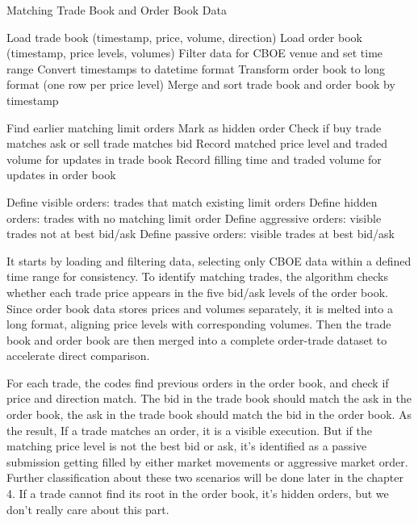 \begin{algorithm}
    \caption{Matching Trade Book and Order Book Data}
    \label{alg:trade_order_matching}
    \begin{algorithmic}[1]
        \State Load trade book (timestamp, price, volume, direction)
        \State Load order book (timestamp, price levels, volumes)
        \State Filter data for CBOE venue and set time range
        \State Convert timestamps to datetime format
        \State Transform order book to long format (one row per price level)
        \State Merge and sort trade book and order book by timestamp
    
            \State Find earlier matching limit orders
                \State Mark as hidden order
            \Else
                \State Check if buy trade matches ask or sell trade matches bid
                \State Record matched price level and traded volume for updates in trade book
                \State Record filling time and traded volume for updates in order book
            \EndIf
        \EndFor
    
        \State Define visible orders: trades that match existing limit orders
        \State Define hidden orders: trades with no matching limit order
        \State Define aggressive orders: visible trades not at best bid/ask
        \State Define passive orders: visible trades at best bid/ask
    
    \end{algorithmic}
\end{algorithm}

It starts by loading and filtering data, selecting only CBOE data within a defined time range for consistency. To identify matching trades, the algorithm checks whether each trade price appears in the five bid/ask levels of the order book. Since order book data stores prices and volumes separately, it is melted into a long format, aligning price levels with corresponding volumes. Then the trade book and order book are then merged into a complete order-trade dataset to accelerate direct comparison.

For each trade, the codes find previous orders in the order book, and check if price and direction match. The bid in the trade book should match the ask in the order book, the ask in the trade book should match the bid in the order book. As the result, If a trade matches an order, it is a visible execution. But if the matching price level is not the best bid or ask, it's identified as a passive submission getting filled by either market movements or aggressive market order. Further classification about these two scenarios will be done later in the chapter 4. If a trade cannot find its root in the order book, it's hidden orders, but we don't really care about this part.

